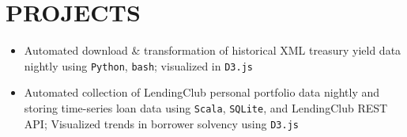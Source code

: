 \documentclass[]{deedy-resume-openfont}
\begin{document}
\section{PROJECTS}


\begin{itemize} %

\item Automated download \& transformation of historical XML treasury yield data nightly using \verb|Python|, \verb|bash|; visualized in \verb|D3.js|

\end{itemize} %


\sectionsep


\begin{itemize} %

\item Automated collection of LendingClub personal portfolio data nightly and storing time-series loan data using \verb|Scala|, \verb|SQLite|, and LendingClub REST API; Visualized trends in borrower solvency using \verb|D3.js|

\end{itemize} %


\sectionsep


\begin{comment}
\runsubsection{AUTOMATED FUND RECOMMENDER \hfill 2016}

\location{\href{https://github.com/mshadish/morningstar-scrape/}{https://github.com/mshadish/morningstar-scrape/}}
\begin{itemize} %

\item Scraped morningstar.com daily to identify and broadcast buy/sell opportunities using \verb|Python|, \verb|cron|, SMS


\end{itemize} %
\sectionsep
\end{comment}
\end{document}
